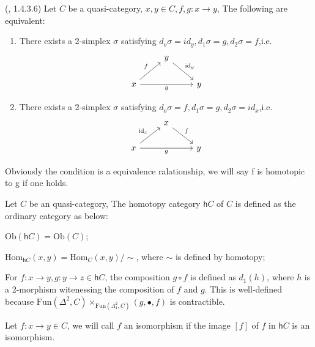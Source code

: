 \begin{theorem}(\textcite{ker}, 1.4.3.6)
    Let $C$ be a quasi-category, $x,y \in C, f,g:x\to y$, The following are equivalent:

    \begin{enumerate}
    \item There exists a 2-simplex $\sigma$ satisfying $d_o\sigma=id_y,d_1\sigma=g,d_2\sigma=f$,i.e.
\[
\begin{tikzcd}
& y \arrow[dr, "\text{id}_y"] & \\
x \arrow[ur, "f"] \arrow[rr, "g"'] & & y
\end{tikzcd}
\]
    
    \item There exists a 2-simplex $\sigma$ satisfying $d_o\sigma=f,d_1\sigma=g,d_2\sigma=id_x$,i.e.
\[
\begin{tikzcd}
& x \arrow[dr, "f"] & \\
x \arrow[ur, "\text{id}_x"] \arrow[rr, "g"'] & & y
\end{tikzcd}
\]
\end{enumerate}
\end{theorem}

\begin{remark}
    
Obviously the condition is a equivalence ralationship, we will say f is homotopic to g if one holds.

\end{remark}

\begin{definition}
    Let $C$ be an quasi-category, The homotopy category $\textsf{h}C$ of $C$ is defined as the ordinary category as below:

$\text{Ob}(\textsf{h}C)=\text{Ob}(C)$;

$\text{Hom}_{\textsf{h}C}(x,y)=\text{Hom}_C(x,y)/\sim$, where $\sim$ is defined by homotopy;

For $f:x\to y,g:y\to z \in \textsf{h}C$, the composition $g\circ f$ is defined as $d_1(h)$, where $h$ is a 2-morphism witenessing the composition of $f$ and $g$. This is well-defined because $\text{Fun}(\Delta^2,C)\times_{\text{Fun}(\Lambda^2_1,C)}(g,\bullet,f)$ is contractible.
    
\end{definition}

\begin{remark}
    Let $f:x\to y\in C$, we will call $f$ an isomorphism if the image $[f]$ of $f$ in $\textsf{h}C$ is an isomorphism.
\end{remark}

